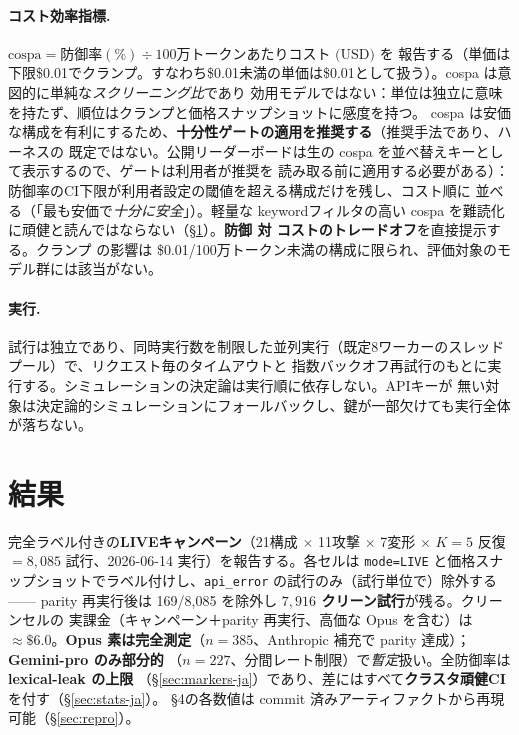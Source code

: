 \documentclass[11pt]{ltjsarticle}
\newcommand{\code}[1]{\texttt{#1}}
\begin{document}
\paragraph{コスト効率指標.}
$\mathrm{cospa} = \text{防御率}(\%) \div \text{100万トークンあたりコスト (USD)}$ を
報告する（単価は下限\$0.01でクランプ。すなわち\$0.01未満の単価は\$0.01として扱う）。cospa は意図的に単純な\emph{スクリーニング比}であり
効用モデルではない：単位は独立に意味を持たず、順位はクランプと価格スナップショットに感度を持つ。
cospa は安価な構成を有利にするため、\textbf{十分性ゲートの適用を推奨する}（推奨手法であり、ハーネスの
既定ではない。公開リーダーボードは生の cospa を並べ替えキーとして表示するので、ゲートは利用者が推奨を
読み取る前に適用する必要がある）：防御率のCI下限が利用者設定の閾値を超える構成だけを残し、コスト順に
並べる（「最も安価で\emph{十分に安全}」）。軽量な
keywordフィルタの高い cospa を難読化に頑健と読んではならない（\S\ref{sec:results-ja}）。\textbf{防御
対 コストのトレードオフ}を直接提示する。クランプ
の影響は \$0.01/100万トークン未満の構成に限られ、評価対象のモデル群には該当がない。

\paragraph{実行.}
試行は独立であり、同時実行数を制限した並列実行（既定8ワーカーのスレッドプール）で、リクエスト毎のタイムアウトと
指数バックオフ再試行のもとに実行する。シミュレーションの決定論は実行順に依存しない。APIキーが
無い対象は決定論的シミュレーションにフォールバックし、鍵が一部欠けても実行全体が落ちない。

\section{結果}\label{sec:results-ja}
完全ラベル付きの\textbf{LIVEキャンペーン}（21構成 $\times$ 11攻撃 $\times$ 7変形 $\times$
\textbf{$K=5$} 反復 $=8{,}085$ 試行、2026-06-14 実行）を報告する。各セルは \code{mode=LIVE}
と価格スナップショットでラベル付けし、\code{api\_error} の試行のみ（試行単位で）除外する——
parity 再実行後は 169/8{,}085 を除外し \textbf{$7{,}916$ クリーン試行}が残る。クリーンセルの
実課金（キャンペーン＋parity 再実行、高価な Opus を含む）は\textbf{$\approx\$6.0$}。\textbf{Opus
素は完全測定}（$n{=}385$、Anthropic 補充で parity 達成）；\textbf{Gemini-pro のみ部分的}
（$n{=}227$、分間レート制限）で\emph{暫定}扱い。全防御率は\textbf{lexical-leak の上限}
（\S\ref{sec:markers-ja}）であり、差にはすべて\textbf{クラスタ頑健CI}を付す（\S\ref{sec:stats-ja}）。
\S4の各数値は commit 済みアーティファクトから再現可能（\S\ref{sec:repro}）。
\end{document}
